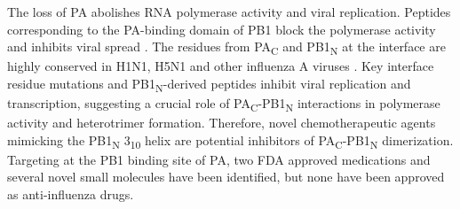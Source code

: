 The loss of PA abolishes RNA polymerase activity and viral replication. Peptides corresponding to the PA-binding domain of PB1 block the polymerase activity and inhibits viral spread \citep{1234,1575,1541}.
The residues from PA\textsubscript{C} and PB1\textsubscript{N} at the interface are highly conserved in H1N1, H5N1 and other influenza A viruses \citep{1540,1575}.
Key interface residue mutations and PB1\textsubscript{N}-derived peptides inhibit viral replication and transcription, suggesting a crucial role of PA\textsubscript{C}-PB1\textsubscript{N} interactions in polymerase activity and heterotrimer formation. Therefore, novel chemotherapeutic agents mimicking the PB1\textsubscript{N} 3\textsubscript{10} helix are potential inhibitors of PA\textsubscript{C}-PB1\textsubscript{N} dimerization. Targeting at the PB1 binding site of PA, two FDA approved medications \citep{1576} and several novel small molecules \citep{1235,1550,1542,1527} have been identified, but none have been approved as anti-influenza drugs.%
